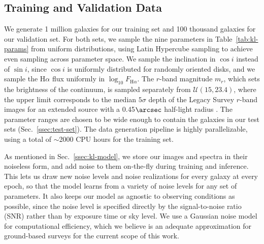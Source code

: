 \subsection{Training and Validation Data}
\label{ssec:datasets}

We generate 1 million galaxies for our training set and 100 thousand galaxies for our validation set.  For both sets, we sample the nine parameters in Table~\ref{tab:kl-params} from uniform distributions, using Latin Hypercube sampling to achieve even sampling across parameter space. We sample the inclination in $\cos i$ instead of $\sin i$, since $\cos i$ is uniformly distributed for randomly oriented disks, and we sample the H$\alpha$ flux uniformly in $\log_{10}F_{\mathrm{H}\alpha}$. The $r$-band magnitude $m_r$, which sets the brightness of the continuum, is sampled separately from $\mathcal{U}(15, 23.4)$, where the upper limit corresponds to the median $5\sigma$ depth of the Legacy Survey $r$-band images for an extended source with a 0.45$\arcsec$ half-light radius \citep{KLDESI}. The parameter ranges are chosen to be wide enough to contain the galaxies in our test sets (Sec.~\ref{ssec:test-set}). The data generation pipeline is highly parallelizable, using a total of $\sim$2000 CPU hours for the training set.

As mentioned in Sec.~\ref{ssec:kl-model}, we store our images and spectra in their noiseless form, and add noise to them on-the-fly during training and inference. This lets us draw new noise levels and noise realizations for every galaxy at every epoch, so that the model learns from a variety of noise levels for any set of parameters. It also keeps our model as agnostic to observing conditions as possible, since the noise level is specified directly by the signal-to-noise ratio (SNR) rather than by exposure time or sky level. We use a Gaussian noise model for computational efficiency, which we believe is an adequate approximation for ground-based surveys for the current scope of this work.

